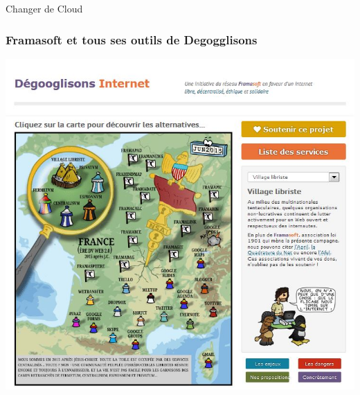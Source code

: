 \documentclass{beamer}
\begin{document}
\begin{frame}
\begin{center}
\Huge{Changer de Cloud}
\end{center}
\end{frame}
\begin{frame}
\begin{center}
\frametitle{Framasoft et tous ses outils de Degogglisons}
\includegraphics[scale=0.6] {./images/framasoft_degogglisons.jpg}
\end{center}
\end{frame}
\end{document}
